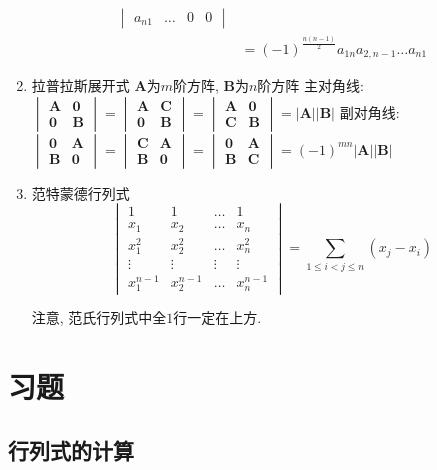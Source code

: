 \begin{enumerate}
\begin{equation*}
\begin{aligned}
\begin{vmatrix}
a_{n1} & \dots & 0 & 0
\end{vmatrix}\\ & =
(-1)^{\frac{n(n-1)}{2}}a_{1n}a_{2,n-1}\dots a_{n1}
\end{aligned}
\end{equation*}
\item 拉普拉斯展开式
\subitem $ \bm{A} $为$ m $阶方阵, $ \bm{B} $为$ n $阶方阵
\subitem 主对角线:
$ \begin{vmatrix}
\bm{A} & \bm{0} \\
\bm{0} & \bm{B}
\end{vmatrix} =
\begin{vmatrix}
\bm{A} & \bm{C} \\
\bm{0} & \bm{B}
\end{vmatrix} =
\begin{vmatrix}
\bm{A} & \bm{0} \\
\bm{C} & \bm{B}
\end{vmatrix} = |\bm{A}||\bm{B}|$
\subitem 副对角线:$
\begin{vmatrix}
\bm{0} & \bm{A} \\
\bm{B} & \bm{0}
\end{vmatrix} =
\begin{vmatrix}
\bm{C} & \bm{A} \\
\bm{B} & \bm{0}
\end{vmatrix} =
\begin{vmatrix}
\bm{0} & \bm{A} \\
\bm{B} & \bm{C}
\end{vmatrix} = (-1)^{mn}|\bm{A}||\bm{B}|$
\item 范特蒙德行列式
\begin{equation*}
\begin{vmatrix}
1 & 1 & \dots & 1 \\
x_1 & x_2 & \dots & x_n \\
x_1^2 & x_2^2 & \dots & x_n^2 \\
\vdots & \vdots  & \vdots & \vdots \\
x_{1}^{n-1} & x_{2}^{n-1} & \dots & x_{n}^{n-1}
\end{vmatrix} = \sum_{1\le i<j\le n}(x_{j}-x_{i})
\end{equation*}\par
注意, 范氏行列式中全$1$行一定在上方.
\end{enumerate}
\section{习题}
\subsection{行列式的计算}
